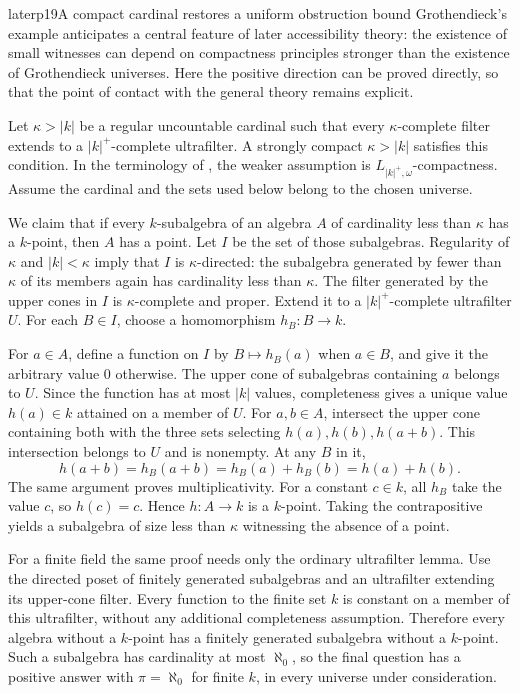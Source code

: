 \begin{dcomment}{later}{p19}{A compact cardinal restores a uniform obstruction bound}
Grothendieck's example anticipates a central feature of later accessibility theory: the existence of small witnesses can depend on compactness principles stronger than the existence of Grothendieck universes. Here the positive direction can be proved directly, so that the point of contact with the general theory remains explicit.

Let $\kappa>|k|$ be a regular uncountable cardinal such that every $\kappa$-complete filter extends to a $|k|^+$-complete ultrafilter. A strongly compact $\kappa>|k|$ satisfies this condition. In the terminology of \citet[Definition~2.3]{BrookeTaylorRosicky2017}, the weaker assumption is $L_{|k|^+,\omega}$-compactness. Assume the cardinal and the sets used below belong to the chosen universe.

We claim that if every $k$-subalgebra of an algebra $A$ of cardinality less than $\kappa$ has a $k$-point, then $A$ has a point. Let $I$ be the set of those subalgebras. Regularity of $\kappa$ and $|k|<\kappa$ imply that $I$ is $\kappa$-directed: the subalgebra generated by fewer than $\kappa$ of its members again has cardinality less than $\kappa$. The filter generated by the upper cones in $I$ is $\kappa$-complete and proper. Extend it to a $|k|^+$-complete ultrafilter $U$. For each $B\in I$, choose a homomorphism $h_B:B\to k$.

For $a\in A$, define a function on $I$ by $B\mapsto h_B(a)$ when $a\in B$, and give it the arbitrary value $0$ otherwise. The upper cone of subalgebras containing $a$ belongs to $U$. Since the function has at most $|k|$ values, completeness gives a unique value $h(a)\in k$ attained on a member of $U$. For $a,b\in A$, intersect the upper cone containing both with the three sets selecting $h(a),h(b),h(a+b)$. This intersection belongs to $U$ and is nonempty. At any $B$ in it,
\[
 h(a+b)=h_B(a+b)=h_B(a)+h_B(b)=h(a)+h(b).
\]
The same argument proves multiplicativity. For a constant $c\in k$, all $h_B$ take the value $c$, so $h(c)=c$. Hence $h:A\to k$ is a $k$-point. Taking the contrapositive yields a subalgebra of size less than $\kappa$ witnessing the absence of a point.

For a finite field the same proof needs only the ordinary ultrafilter lemma. Use the directed poset of finitely generated subalgebras and an ultrafilter extending its upper-cone filter. Every function to the finite set $k$ is constant on a member of this ultrafilter, without any additional completeness assumption. Therefore every algebra without a $k$-point has a finitely generated subalgebra without a $k$-point. Such a subalgebra has cardinality at most $\aleph_0$, so the final question has a positive answer with $\pi=\aleph_0$ for finite $k$, in every universe under consideration.


\end{dcomment}
